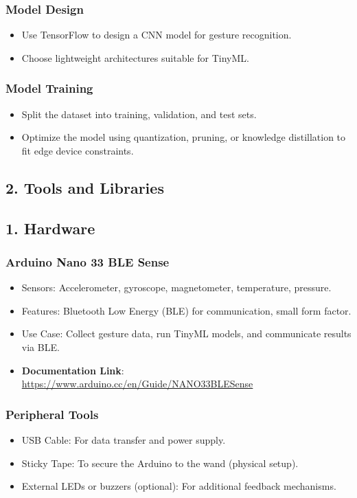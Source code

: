 \subsubsection{Model Design}
\begin{itemize}
    \item Use TensorFlow to design a CNN model for gesture recognition.
    \item Choose lightweight architectures suitable for TinyML.
\end{itemize}

\subsubsection{Model Training}
\begin{itemize}
    \item Split the dataset into training, validation, and test sets.
    \item Optimize the model using quantization, pruning, or knowledge distillation to fit edge device constraints.
\end{itemize}

\subsection{2. Tools and Libraries}

\subsection{1. Hardware}

\subsubsection{Arduino Nano 33 BLE Sense}
\begin{itemize}
    \item Sensors: Accelerometer, gyroscope, magnetometer, temperature, pressure.
    \item Features: Bluetooth Low Energy (BLE) for communication, small form factor.
    \item Use Case: Collect gesture data, run TinyML models, and communicate results via BLE.
    \item \textbf{Documentation Link}: \url{https://www.arduino.cc/en/Guide/NANO33BLESense}
\end{itemize}

\subsubsection{Peripheral Tools}
\begin{itemize}
    \item USB Cable: For data transfer and power supply.
    \item Sticky Tape: To secure the Arduino to the wand (physical setup).
    \item External LEDs or buzzers (optional): For additional feedback mechanisms.
\end{itemize}

